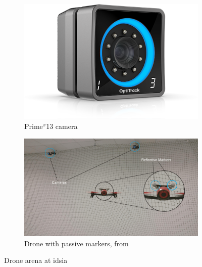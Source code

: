 \begin{figure}[!htb]
	\begin{center}
		\begin{subfigure}[h]{0.29\textwidth}
			\centering
			\includegraphics[width=1\textwidth]{"contents/images/03-optitrack-camera"}
			\caption[]{Prime$^x$13 camera}
			\label{fig:optitrack-camera}
		\end{subfigure}
		\hfill
		\begin{subfigure}[h]{0.69\textwidth}
			\centering
			\includegraphics[width=1\textwidth]{"contents/images/03-arena"}
			\caption[]{Drone with passive markers, from \cite{mantegazza2018thesis}}
			\label{fig:drone-arena}
		\end{subfigure}
	\end{center}
	\vspace{-0.5cm}
	\caption[Drone arena at \gls{idsia}]{Drone arena at \gls{idsia}}
\end{figure}



